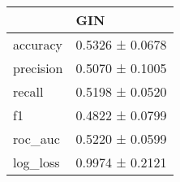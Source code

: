 \begin{tabular}{ll}
\toprule
 & GIN \\
\midrule
accuracy & 0.5326 ± 0.0678 \\
precision & 0.5070 ± 0.1005 \\
recall & 0.5198 ± 0.0520 \\
f1 & 0.4822 ± 0.0799 \\
roc_auc & 0.5220 ± 0.0599 \\
log_loss & 0.9974 ± 0.2121 \\
\bottomrule
\end{tabular}
